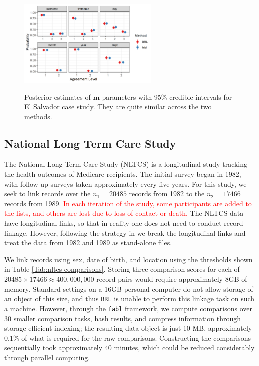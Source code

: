 \documentclass[ba]{imsart}
\begin{document}
	
	\begin{figure}[t]
		\begin{center}
			\includegraphics[width=0.6\textwidth]{../notes/figures/el_salvador/m_posterior_smallP} 
			\caption{Posterior estimates of $\bm{m}$ parameters with 95\% credible intervals for El Salvador case study. They are quite similar across the two methods.}\label{fig:m-and-u}
			\label{fig:m-and-u}
		\end{center}
	\end{figure}
	
	\subsection{National Long Term Care Study}
	\label{nltcs}
	
	The National Long Term Care Study (NLTCS) is a longitudinal study tracking the health outcomes of Medicare recipients. The initial survey began in 1982, with follow-up surveys taken approximately every five years. For this study, we seek to link records over the $n_1 = 20485$ records from 1982 to the $n_2 = 17466$ records from 1989. \textcolor{red}{In each iteration of the study, some participants are added to the lists, and others are lost due to loss of contact or death.} The NLTCS data have longitudinal links, so that in reality one does not need to conduct record linkage.  However, following the strategy in \cite{guha:reiter:BA} we break the longitudinal links and treat the data from 1982 and 1989 as stand-alone files.
	
	We link records using sex, date of birth, and location using the thresholds shown in Table \ref{Tab:nltcs-comparisons}. Storing three comparison scores for each of $20485 \times 17466 \approx 400,000,000$ record pairs would require approximately 8GB of memory. Standard settings on a 16GB personal computer do not allow storage of an object of this size, and thus \texttt{BRL} is unable to perform this linkage task on such a machine. However, through the \texttt{fabl} framework, we compute comparisons over 30 smaller comparison tasks, hash results, and compress information through storage efficient indexing; the resulting data object is just 10 MB, approximately 0.1\% of what is required for the raw comparisons. Constructing the comparisons sequentially took approximately 40 minutes, which could be reduced considerably through parallel computing. 
	
\end{document}
